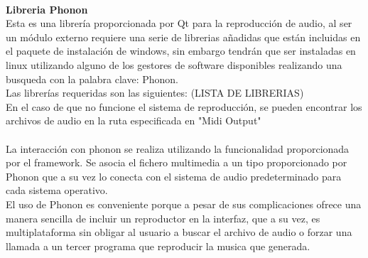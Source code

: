 \newline
\\{\bf Libreria Phonon}
\\Esta es una librería proporcionada por Qt para la reproducción de audio, al ser un módulo externo requiere una serie de librerias añadidas que están incluidas en el paquete de instalación de windows, sin embargo tendrán que ser instaladas en linux utilizando alguno de los gestores de software disponibles realizando una busqueda con la palabra clave: Phonon.
\\Las librerías requeridas son las siguientes: (LISTA DE LIBRERIAS)
\\En el caso de que no funcione el sistema de reproducción, se pueden encontrar los archivos de audio en la ruta especificada en "Midi Output"
\newline
\\
\\La interacción con phonon se realiza utilizando la funcionalidad proporcionada por el framework. Se asocia el fichero multimedia a un tipo proporcionado por Phonon que a su vez lo conecta con el sistema de audio predeterminado para cada sistema operativo.
\\El uso de Phonon es conveniente porque a pesar de sus complicaciones ofrece una manera sencilla de incluir un reproductor en la interfaz, que a su vez, es multiplataforma sin obligar al usuario a buscar el archivo de audio o forzar una llamada a un tercer programa que reproducir la musica que generada.